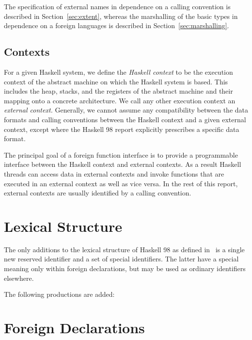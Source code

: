 \documentclass[a4paper,twosides]{article}
\begin{document}
The specification of external names in dependence on a calling convention is
described in Section~\ref{sec:extent}, whereas the marshalling of the basic
types in dependence on a foreign languages is described in
Section~\ref{sec:marshalling}.

\subsection{Contexts}

For a given Haskell system, we define the \emph{Haskell context} to be the
execution context of the abstract machine on which the Haskell system is
based.  This includes the heap, stacks, and the registers of the abstract
machine and their mapping onto a concrete architecture.  We call any other
execution context an \emph{external context.}  Generally, we cannot assume any
compatibility between the data formats and calling conventions between the
Haskell context and a given external context, except where the Haskell 98
report explicitly prescribes a specific data format.

The principal goal of a foreign function interface is to provide a
programmable interface between the Haskell context and external contexts.  As
a result Haskell threads can access data in external contexts and invoke
functions that are executed in an external context as well as vice versa.  In
the rest of this report, external contexts are usually identified by a calling
convention. 


\newpage
\section{Lexical Structure}

The only additions to the lexical structure of Haskell 98 as defined
in~\cite[Section~2]{haskell98} is a single new reserved identifier and a set
of special identifiers.  The latter have a special meaning only within foreign
declarations, but may be used as ordinary identifiers elsewhere.

The following productions are added:
%
\begin{grammar}
\end{grammar}


\newpage
\section{Foreign Declarations}
\end{document}
